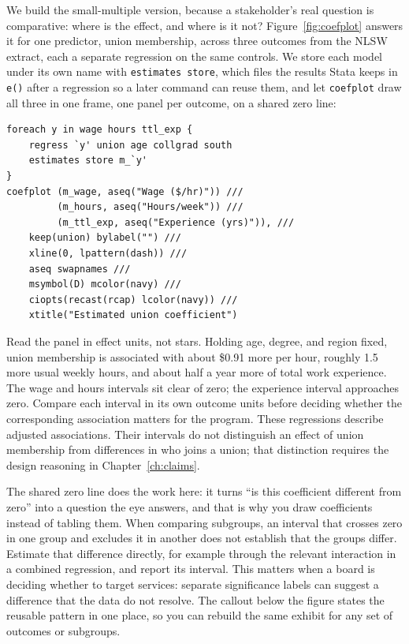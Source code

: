 We build the small-multiple version, because a stakeholder's real question is comparative: where is the effect, and where is it not? Figure~\ref{fig:coefplot} answers it for one predictor, union membership, across three outcomes from the NLSW extract, each a separate regression on the same controls. We store each model under its own name with \texttt{estimates store}, which files the results Stata keeps in \texttt{e()} after a regression so a later command can reuse them, and let \texttt{coefplot} draw all three in one frame, one panel per outcome, on a shared zero line:
\par
{\footnotesize
\begin{verbatim}
foreach y in wage hours ttl_exp {
    regress `y' union age collgrad south
    estimates store m_`y'
}
coefplot (m_wage, aseq("Wage ($/hr)")) ///
         (m_hours, aseq("Hours/week")) ///
         (m_ttl_exp, aseq("Experience (yrs)")), ///
    keep(union) bylabel("") ///
    xline(0, lpattern(dash)) ///
    aseq swapnames ///
    msymbol(D) mcolor(navy) ///
    ciopts(recast(rcap) lcolor(navy)) ///
    xtitle("Estimated union coefficient")
\end{verbatim}
}

Read the panel in effect units, not stars. Holding age, degree, and region fixed, union membership is associated with about \$0.91 more per hour, roughly 1.5 more usual weekly hours, and about half a year more of total work experience. The wage and hours intervals sit clear of zero; the experience interval approaches zero. Compare each interval in its own outcome units before deciding whether the corresponding association matters for the program. These regressions describe adjusted associations. Their intervals do not distinguish an effect of union membership from differences in who joins a union; that distinction requires the design reasoning in Chapter~\ref{ch:claims}.

The shared zero line does the work here: it turns \enquote{is this coefficient different from zero} into a question the eye answers, and that is why you draw coefficients instead of tabling them. When comparing subgroups, an interval that crosses zero in one group and excludes it in another does not establish that the groups differ. Estimate that difference directly, for example through the relevant interaction in a combined regression, and report its interval. This matters when a board is deciding whether to target services: separate significance labels can suggest a difference that the data do not resolve. The callout below the figure states the reusable pattern in one place, so you can rebuild the same exhibit for any set of outcomes or subgroups.

